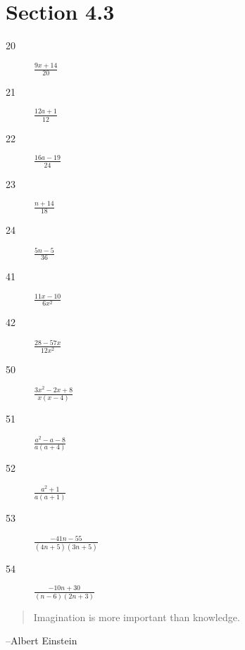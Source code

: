 \documentclass[letterpaper]{exam}
\begin{document}
  \ifprintanswers{}
    \section{Section 4.3} %
    
    \begin{description}
      \item[20] $\frac{9x + 14}{20}$

      \item[21] $\frac{12a + 1}{12}$

      \item[22] $\frac{16a - 19}{24}$

      \item[23] $\frac{n + 14}{18}$

      \item[24] $\frac{5n-5}{36}$

      \item[41] $\frac{11x - 10}{6x^2}$

      \item[42] $\frac{28 - 57x}{12x^2}$

      \item[50] $\frac{3x^2 - 2x + 8}{x(x-4)}$

      \item[51] $\frac{a^2 - a - 8}{a(a+4)}$

      \item[52] $\frac{a^2 + 1}{a(a+1)}$

      \item[53] $\frac{-41n - 55}{(4n + 5)(3n + 5)}$

      \item[54] $\frac{-10n + 30}{(n-6)(2n+3)}$

    \end{description}

  \fi
  \ifprintanswers{}
  \else
    \vspace{9 cm}
    \begin{quote}
      \begin{em}
        Imagination is more important than knowledge.
      \end{em}
    \end{quote}
    \hspace{2 cm}--Albert Einstein
  \fi
\end{document}
